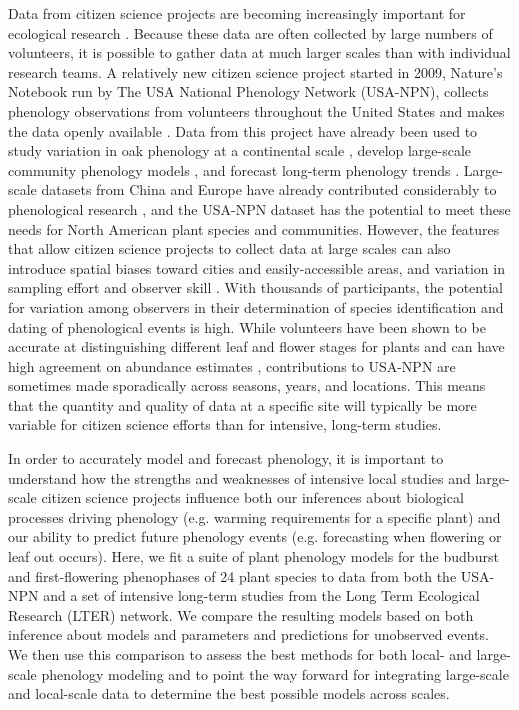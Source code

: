 \documentclass[fleqn,12pt,lineno]{article}
\begin{document}
Data from citizen science projects are becoming increasingly important for ecological research \citep{kelling2009, dickinson2010, tulloch2013}. Because these data are often collected by large numbers of volunteers, it is possible to gather data at much larger scales than with individual research teams. A relatively new citizen science project started in 2009, Nature's Notebook run by The USA National Phenology Network (USA-NPN), collects phenology observations from volunteers throughout the United States and makes the data openly available \citep{npncitation}. Data from this project have already been used to study variation in oak phenology at a continental scale \citep{gerst2017}, develop large-scale community phenology models \citep{melaas2016}, and forecast long-term phenology trends \citep{jeong2013}. Large-scale datasets from China and Europe have already contributed considerably to phenological research \citep{xu2013, olsson2014, basler2016, zhang2017}, and the USA-NPN dataset has the potential to meet these needs for North American plant species and communities. However, the features that allow citizen science projects to collect data at large scales can also introduce spatial biases toward cities and easily-accessible areas, and variation in sampling effort and observer skill \citep{dickinson2010}. With thousands of participants, the potential for variation among observers in their determination of species identification and dating of phenological events is high. While volunteers have been shown to be accurate at distinguishing different leaf and flower stages for plants \citep{fuccillo2015} and can have high agreement on abundance estimates \citep{feldman2018}, contributions to USA-NPN are sometimes made sporadically across seasons, years, and locations. This means that the quantity and quality of data at a specific site will typically be more variable for citizen science efforts than for intensive, long-term studies.

In order to accurately model and forecast phenology, it is important to understand how the strengths and weaknesses of intensive local studies and large-scale citizen science projects influence both our inferences about biological processes driving phenology (e.g. warming requirements for a specific plant) and our ability to predict future phenology events (e.g. forecasting when flowering or leaf out occurs). Here, we fit a suite of plant phenology models for the budburst and first-flowering phenophases of 24 plant species to data from both the USA-NPN and a set of intensive long-term studies from the Long Term Ecological Research (LTER) network. We compare the resulting models based on both inference about models and parameters and predictions for unobserved events. We then use this comparison to assess the best methods for both local- and large-scale phenology modeling and to point the way forward for integrating large-scale and local-scale data to determine the best possible models across scales.
\end{document}
